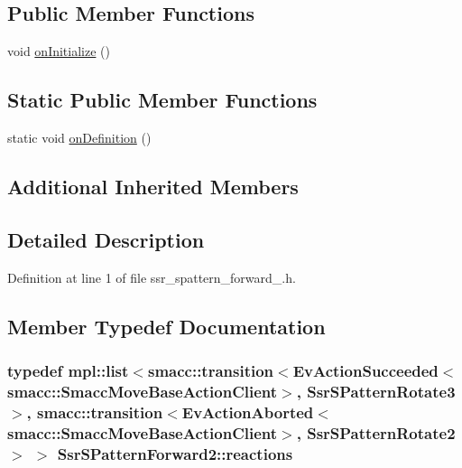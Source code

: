 \subsection*{Public Member Functions}
\begin{DoxyCompactItemize}
\item 
void \hyperlink{structSsrSPatternForward2_a9271aa70005c791d87e03a2b1c02900a}{on\+Initialize} ()
\end{DoxyCompactItemize}
\subsection*{Static Public Member Functions}
\begin{DoxyCompactItemize}
\item 
static void \hyperlink{structSsrSPatternForward2_a9b2bc23e0f05d3f5b5db22cc0489c5a6}{on\+Definition} ()
\end{DoxyCompactItemize}
\subsection*{Additional Inherited Members}


\subsection{Detailed Description}


Definition at line 1 of file ssr\+\_\+spattern\+\_\+forward\+\_.\+h.



\subsection{Member Typedef Documentation}
\subsubsection[{\texorpdfstring{reactions}{reactions}}]{\setlength{\rightskip}{0pt plus 5cm}typedef mpl\+::list$<${\bf smacc\+::transition}$<$Ev\+Action\+Succeeded$<${\bf smacc\+::\+Smacc\+Move\+Base\+Action\+Client}$>$, {\bf Ssr\+S\+Pattern\+Rotate3}$>$, {\bf smacc\+::transition}$<$Ev\+Action\+Aborted$<${\bf smacc\+::\+Smacc\+Move\+Base\+Action\+Client}$>$, {\bf Ssr\+S\+Pattern\+Rotate2}$>$ $>$ {\bf Ssr\+S\+Pattern\+Forward2\+::reactions}}\hypertarget{structSsrSPatternForward2_af4045e4c93ca510b7348dc6a9d5fc84d}{}\label{structSsrSPatternForward2_af4045e4c93ca510b7348dc6a9d5fc84d}


